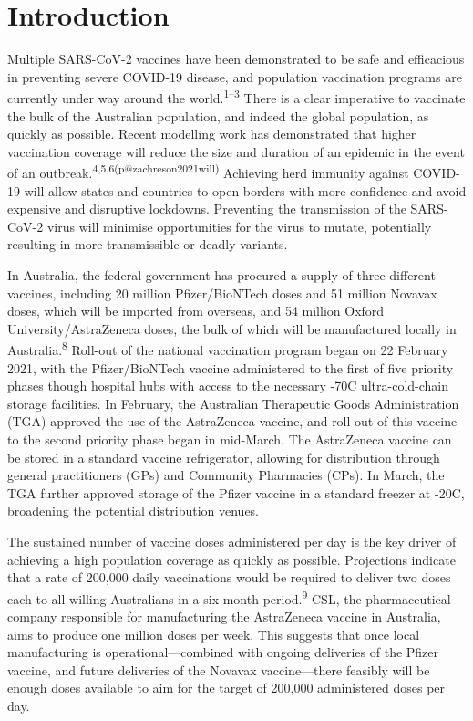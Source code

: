 \documentclass{article}
\begin{document}

\newpage

\hypertarget{introduction}{%
\section{Introduction}\label{introduction}}

Multiple SARS-CoV-2 vaccines have been demonstrated to be safe and
efficacious in preventing severe COVID-19 disease, and population
vaccination programs are currently under way around the
world.\textsuperscript{1--3} There is a clear imperative to vaccinate
the bulk of the Australian population, and indeed the global population,
as quickly as possible. Recent modelling work has demonstrated that
higher vaccination coverage will reduce the size and duration of an
epidemic in the event of an
outbreak.\textsuperscript{4,5,6(p@zachreson2021will)} Achieving herd
immunity against COVID-19 will allow states and countries to open
borders with more confidence and avoid expensive and disruptive
lockdowns. Preventing the transmission of the SARS-CoV-2 virus will
minimise opportunities for the virus to mutate, potentially resulting in
more transmissible or deadly variants.

In Australia, the federal government has procured a supply of three
different vaccines, including 20 million Pfizer/BioNTech doses and 51
million Novavax doses, which will be imported from overseas, and 54
million Oxford University/AstraZeneca doses, the bulk of which will be
manufactured locally in Australia.\textsuperscript{8} Roll-out of the
national vaccination program began on 22 February 2021, with the
Pfizer/BioNTech vaccine administered to the first of five priority
phases though hospital hubs with access to the necessary -70\degree C
ultra-cold-chain storage facilities. In February, the Australian
Therapeutic Goods Administration (TGA) approved the use of the
AstraZeneca vaccine, and roll-out of this vaccine to the second priority
phase began in mid-March. The AstraZeneca vaccine can be stored in a
standard vaccine refrigerator, allowing for distribution through general
practitioners (GPs) and Community Pharmacies (CPs). In March, the TGA
further approved storage of the Pfizer vaccine in a standard freezer at
-20\degree C, broadening the potential distribution venues.

The sustained number of vaccine doses administered per day is the key
driver of achieving a high population coverage as quickly as possible.
Projections indicate that a rate of 200,000 daily vaccinations would be
required to deliver two doses each to all willing Australians in a six
month period.\textsuperscript{9} CSL, the pharmaceutical company
responsible for manufacturing the AstraZeneca vaccine in Australia, aims
to produce one million doses per week. This suggests that once local
manufacturing is operational---combined with ongoing deliveries of the
Pfizer vaccine, and future deliveries of the Novavax vaccine---there
feasibly will be enough doses available to aim for the target of 200,000
administered doses per day.
\end{document}
